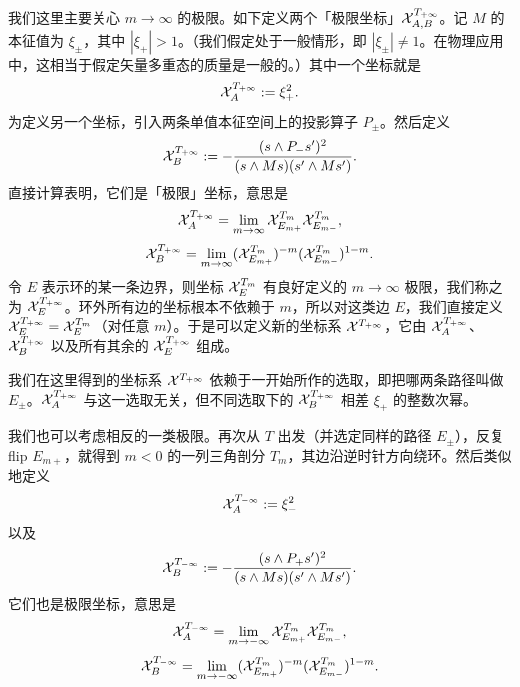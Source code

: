 
我们这里主要关心 $m\to\infty$ 的极限。如下定义两个「极限坐标」$\mathcal{X}^{T_{+\infty}}_{A,B}$。记 $M$ 的本征值为 $\xi_\pm$，其中 $|\xi_+|>1$。（我们假定处于一般情形，即 $|\xi_\pm|\neq1$。在物理应用中，这相当于假定矢量多重态的质量是一般的。）其中一个坐标就是
\begin{equation}\label{eq:A-positive}
\mathcal{X}^{T_{+\infty}}_A := \xi_+^{2}.
\end{equation}
为定义另一个坐标，引入两条单值本征空间上的投影算子 $P_\pm$。然后定义
\begin{equation}\label{eq:B-positive}
\mathcal{X}^{T_{+\infty}}_B := -\frac{(s\wedge P_- s')^2}{(s\wedge Ms)(s'\wedge Ms')}.
\end{equation}
直接计算表明，它们是「极限」坐标，意思是
\begin{equation}\label{eq:limiting-1}
\mathcal{X}^{T_{+\infty}}_A = \lim_{m\to\infty}\mathcal{X}^{T_m}_{E_{m+}}\mathcal{X}^{T_m}_{E_{m-}},
\end{equation}
\begin{equation}\label{eq:limiting-2}
\mathcal{X}^{T_{+\infty}}_B = \lim_{m\to\infty}(\mathcal{X}^{T_m}_{E_{m+}})^{-m}(\mathcal{X}^{T_m}_{E_{m-}})^{1-m}.
\end{equation}
令 $E$ 表示环的某一条边界，则坐标 $\mathcal{X}^{T_m}_E$ 有良好定义的 $m\to\infty$ 极限，我们称之为 $\mathcal{X}^{T_{+\infty}}_E$。环外所有边的坐标根本不依赖于 $m$，所以对这类边 $E$，我们直接定义 $\mathcal{X}^{T_{+\infty}}_E=\mathcal{X}^{T_m}_E$（对任意 $m$）。于是可以定义新的坐标系 $\mathcal{X}^{T_{+\infty}}$，它由 $\mathcal{X}^{T_{+\infty}}_A$、$\mathcal{X}^{T_{+\infty}}_B$ 以及所有其余的 $\mathcal{X}^{T_{+\infty}}_E$ 组成。

我们在这里得到的坐标系 $\mathcal{X}^{T_{+\infty}}$ 依赖于一开始所作的选取，即把哪两条路径叫做 $E_\pm$。$\mathcal{X}^{T_{+\infty}}_A$ 与这一选取无关，但不同选取下的 $\mathcal{X}^{T_{+\infty}}_B$ 相差 $\xi_+$ 的整数次幂。

我们也可以考虑相反的一类极限。再次从 $T$ 出发（并选定同样的路径 $E_\pm$），反复 flip $E_{m+}$，就得到 $m<0$ 的一列三角剖分 $T_m$，其边沿逆时针方向绕环。然后类似地定义
\begin{equation}\label{eq:A-negative}
\mathcal{X}^{T_{-\infty}}_A := \xi_-^2
\end{equation}
以及
\begin{equation}\label{eq:B-negative}
\mathcal{X}^{T_{-\infty}}_B := -\frac{(s\wedge P_+ s')^2}{(s\wedge Ms)(s'\wedge Ms')}.
\end{equation}
它们也是极限坐标，意思是
\begin{equation}\label{eq:limiting-3}
\mathcal{X}^{T_{-\infty}}_A = \lim_{m\to-\infty}\mathcal{X}^{T_m}_{E_{m+}}\mathcal{X}^{T_m}_{E_{m-}},
\end{equation}
\begin{equation}\label{eq:limiting-4}
\mathcal{X}^{T_{-\infty}}_B = \lim_{m\to-\infty}(\mathcal{X}^{T_m}_{E_{m+}})^{-m}(\mathcal{X}^{T_m}_{E_{m-}})^{1-m}.
\end{equation}

